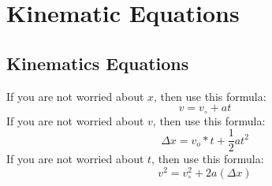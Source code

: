 \section{Kinematic Equations}
		
\subsection{Kinematics Equations}
If you are not worried about $x$, then use this formula: \[v=v_{\circ} +at\]
If you are not worried about $v$, then use this formula: \[\Delta x = v_o*t + \frac{1}{2}at^2\]
If you are not worried about $t$, then use this formula: \[v^2=v_\circ^2+2a(\Delta x)\]